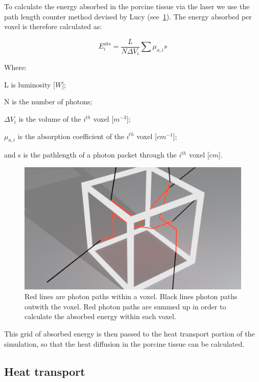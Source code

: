 To calculate the energy absorbed in the porcine tissue via the laser we use the path length counter method devised by Lucy \cite{lucy1999computing} (see~\cref{fig:jmea-explain}). The energy absorbed per voxel is therefore calculated as:

\begin{equation}
E_{i}^{abs} = \frac{L}{N \Delta V_i}\sum\mu_{a,i} s
\label{eqn:Eabs}
\end{equation}

\noindent Where:

	\indent L is luminosity [$W$];
	
	\indent N is the number of photons;
	
	\indent $\Delta V_i$ is the volume of the $i^{th}$ voxel [$m^{-3}$];
	
	\indent $\mu_{a,i}$ is the absorption coefficient of the $i^{th}$ voxel [$cm^{-1}$];
	
	\indent and s is the pathlength of a photon packet through the $i^{th}$ voxel [$cm$].
	
	\medskip
	
\begin{figure}
\centering
\includegraphics[scale=0.25]{./ablation/images/jmea-explain.png}
\caption{Red lines are photon paths within a voxel. Black lines photon paths outwith the voxel. Red photon paths are summed up in order to calculate the absorbed energy within each voxel.}
\label{fig:jmea-explain}
\end{figure}	
		
This grid of absorbed energy is then passed to the heat transport portion of the simulation, so that the heat diffusion in the porcine tissue can be calculated.
\newpage
\subsection{Heat transport}%

